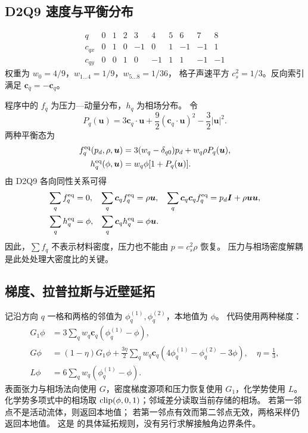 \subsection{D2Q9 速度与平衡分布}
\begin{equation}
 \begin{array}{c|rrrrrrrrr}
 q&0&1&2&3&4&5&6&7&8\\\hline
 c_{qx}&0&1&0&-1&0&1&-1&-1&1\\
 c_{qy}&0&0&1&0&-1&1&1&-1&-1
 \end{array}
\end{equation}
权重为 $w_0=4/9$，$w_{1\ldots4}=1/9$，$w_{5\ldots8}=1/36$，
格子声速平方 $c_s^2=1/3$。反向索引满足 $\bm c_{\bar q}=-\bm c_q$。

程序中的 $f_q$ 为压力—动量分布，$h_q$ 为相场分布。
令
\begin{equation}
 P_q(\bm u)=3\bm c_q\cdot\bm u+\frac92(\bm c_q\cdot\bm u)^2-\frac32|\bm u|^2.
\end{equation}
两种平衡态为
\begin{align}
 f_q^{\rm eq}(p_d,\rho,\bm u)
 &=3(w_q-\delta_{q0})p_d+w_q\rho P_q(\bm u),\label{eq:feq}\\
 h_q^{\rm eq}(\phi,\bm u)&=w_q\phi[1+P_q(\bm u)].\label{eq:heq}
\end{align}
由 D2Q9 各向同性关系可得
\begin{align}
 \sum_q f_q^{\rm eq}&=0,&
 \sum_q\bm c_qf_q^{\rm eq}&=\rho\bm u,&
 \sum_q\bm c_q\bm c_qf_q^{\rm eq}&=p_d\bm I+\rho\bm u\bm u,\\
 \sum_qh_q^{\rm eq}&=\phi,&
 \sum_q\bm c_qh_q^{\rm eq}&=\phi\bm u.&
\end{align}
因此，$\sum f_q$ 不表示材料密度，压力也不能由 $p=c_s^2\rho$ 恢复。
压力与相场密度解耦是此处处理大密度比的关键。


\subsection{梯度、拉普拉斯与近壁延拓}
记沿方向 $q$ 一格和两格的邻值为 $\phi_q^{(1)},\phi_q^{(2)}$，本地值为 $\phi$。
代码使用两种梯度：
\begin{align}
 G_1\phi&=3\sum_qw_q\bm c_q(\phi_q^{(1)}-\phi),\\
 G\phi&=(1-\eta)G_1\phi+\frac{3\eta}{2}
   \sum_qw_q\bm c_q(4\phi_q^{(1)}-\phi_q^{(2)}-3\phi),
   \quad\eta=\frac13,\\
 L\phi&=6\sum_qw_q(\phi_q^{(1)}-\phi).
\end{align}
表面张力与相场法向使用 $G$，密度梯度源项和压力恢复使用 $G_1$，化学势使用 $L$。
化学势多项式中的相场取 $\operatorname{clip}(\phi,0,1)$；邻域差分读取当前存储的相场。
若第一邻点不是活动流体，则返回本地值；
若第一邻点有效而第二邻点无效，两格采样仍返回本地值。
这是  的具体延拓规则，没有另行求解接触角边界条件。

